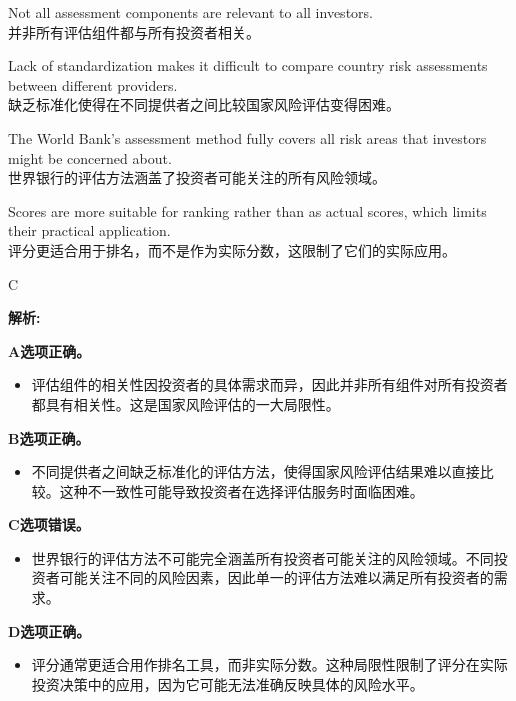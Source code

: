\documentclass{article}
\newenvironment{explanation}
{\textbf{解析:}\par}
{\par}
\begin{document}
\begin{choices}
    \item Not all assessment components are relevant to all investors.\\ 
    并非所有评估组件都与所有投资者相关。
    \item Lack of standardization makes it difficult to compare country risk assessments between different providers.\\ 
    缺乏标准化使得在不同提供者之间比较国家风险评估变得困难。
    \item The World Bank's assessment method fully covers all risk areas that investors might be concerned about.\\ 
    世界银行的评估方法涵盖了投资者可能关注的所有风险领域。
    \item Scores are more suitable for ranking rather than as actual scores, which limits their practical application.\\ 
    评分更适合用于排名，而不是作为实际分数，这限制了它们的实际应用。
\end{choices}

\begin{correctanswer}
    C
\end{correctanswer}

\begin{explanation}
    \textbf{A选项正确。}
    \begin{itemize}
        \item 评估组件的相关性因投资者的具体需求而异，因此并非所有组件对所有投资者都具有相关性。这是国家风险评估的一大局限性。
    \end{itemize}

    \textbf{B选项正确。}
    \begin{itemize}
        \item 不同提供者之间缺乏标准化的评估方法，使得国家风险评估结果难以直接比较。这种不一致性可能导致投资者在选择评估服务时面临困难。
    \end{itemize}

    \textbf{C选项错误。}
    \begin{itemize}
        \item 世界银行的评估方法不可能完全涵盖所有投资者可能关注的风险领域。不同投资者可能关注不同的风险因素，因此单一的评估方法难以满足所有投资者的需求。
    \end{itemize}

    \textbf{D选项正确。}
    \begin{itemize}
        \item 评分通常更适合用作排名工具，而非实际分数。这种局限性限制了评分在实际投资决策中的应用，因为它可能无法准确反映具体的风险水平。
    \end{itemize}
\end{explanation}
\end{document}

